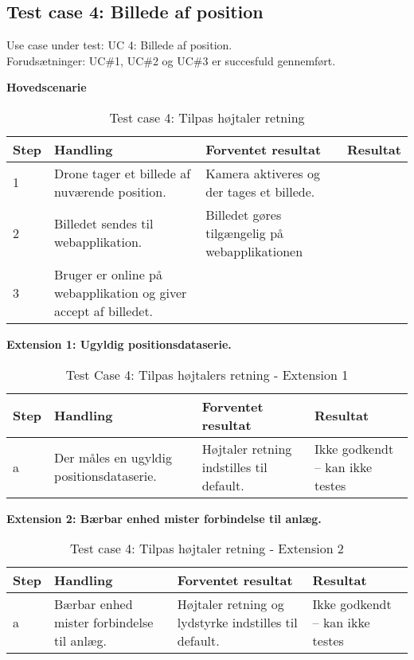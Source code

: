 \newpage

\subsection*{Test case 4: Billede af position}
Use case under test: UC 4: Billede af position.\\
Forudsætninger:	UC\#1, UC\#2 og UC\#3 er succesfuld gennemført.

\textbf{Hovedscenarie}
\begin{table}[H]
	\centering
		\begin{tabular}{|l|p{5 cm}|p{5 cm}|p{3.5 cm}|} 
		\hline
			Step & Handling & Forventet resultat & Resultat\\ \hline
			1 & Drone tager et billede af nuværende position. & Kamera aktiveres og der tages et billede. & \\ \hline
			2 & Billedet sendes til webapplikation. & Billedet gøres tilgængelig på webapplikationen &  \\ \hline
			3 & Bruger er online på webapplikation og giver accept af billedet. &  & \\ \hline
		\end{tabular}
	\caption{Test case 4: Tilpas højtaler retning}
	\label{tab:TC 4}
\end{table}


\textbf{Extension 1: Ugyldig positionsdataserie.}
\begin{table}[H]
	\centering
		\begin{tabular}{|l|p{5 cm}|p{5 cm}|p{3.5 cm}|} 
		\hline
			Step & Handling & Forventet resultat & Resultat\\ \hline
			a & Der måles en ugyldig positionsdataserie. & Højtaler retning indstilles til default. & Ikke godkendt – kan ikke testes 	\\ \hline
		\end{tabular}
	\caption{Test Case 4: Tilpas højtalers retning - Extension 1}
	\label{tab:TC4ex1}
\end{table}

\textbf{Extension 2: Bærbar enhed mister forbindelse til anlæg.}
\begin{table}[H]
	\centering
		\begin{tabular}{|l|p{5 cm}|p{5 cm}|p{3.5 cm}|} 
		\hline
			Step & Handling & Forventet resultat & Resultat\\ \hline
			a & Bærbar enhed mister forbindelse til anlæg. & Højtaler retning og lydstyrke indstilles til default. & Ikke godkendt – kan ikke testes\\ \hline
		\end{tabular}
	\caption{Test case 4: Tilpas højtaler retning - Extension 2}
	\label{tab:TC4ex2}
\end{table}

